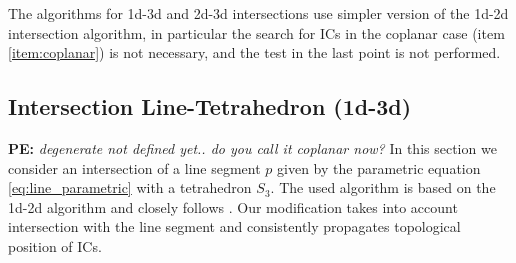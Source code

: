 \documentclass{elsarticle}
\newcommand{\noteJB}[1]{{\color{Blue} \textbf{JB: } \textit{#1}}}
\newcommand{\notePE}[1]{{\color{Orange} \textbf{PE: } \textit{#1}}}
\begin{document}
The algorithms for 1d-3d and 2d-3d intersections use simpler version of the 1d-2d intersection algorithm, in particular the search for ICs in the coplanar case 
(item \ref{item:coplanar}) is not necessary, and the test in the last point is not performed.


\subsection{Intersection Line-Tetrahedron (1d-3d)}
\notePE{degenerate not defined yet.. do you call it coplanar now?}
In this section we consider an intersection of a line segment $p$ given by the parametric equation \eqref{eq:line_parametric} with a tetrahedron 
$S_3$. The used algorithm is based on the 1d-2d algorithm and closely follows \cite{platis_fast_2003}. Our modification takes into account
intersection with the line segment and consistently propagates topological position of ICs.
\end{document}
